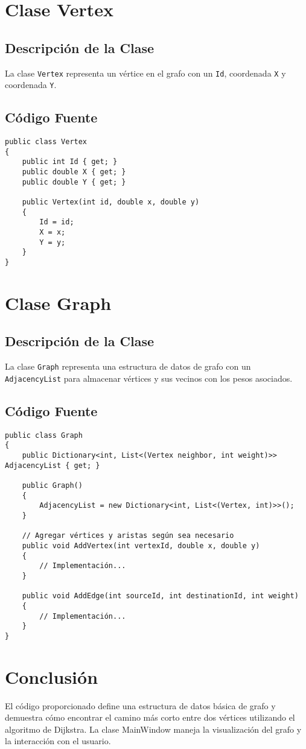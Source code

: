 \documentclass{article}
\begin{document}
\section{Clase Vertex}
\subsection{Descripción de la Clase}
La clase \texttt{Vertex} representa un vértice en el grafo con un \texttt{Id}, coordenada \texttt{X} y coordenada \texttt{Y}.

\subsection{Código Fuente}
\begin{lstlisting}[language={[Sharp]C}]
public class Vertex
{
    public int Id { get; }
    public double X { get; }
    public double Y { get; }

    public Vertex(int id, double x, double y)
    {
        Id = id;
        X = x;
        Y = y;
    }
}
\end{lstlisting}

\section{Clase Graph}
\subsection{Descripción de la Clase}
La clase \texttt{Graph} representa una estructura de datos de grafo con un \texttt{AdjacencyList} para almacenar vértices y sus vecinos con los pesos asociados.

\subsection{Código Fuente}
\begin{lstlisting}[language={[Sharp]C}]
public class Graph
{
    public Dictionary<int, List<(Vertex neighbor, int weight)>> AdjacencyList { get; }

    public Graph()
    {
        AdjacencyList = new Dictionary<int, List<(Vertex, int)>>();
    }

    // Agregar vértices y aristas según sea necesario
    public void AddVertex(int vertexId, double x, double y)
    {
        // Implementación...
    }

    public void AddEdge(int sourceId, int destinationId, int weight)
    {
        // Implementación...
    }
}
\end{lstlisting}

\section{Conclusión}
El código proporcionado define una estructura de datos básica de grafo y demuestra cómo encontrar el camino más corto entre dos vértices utilizando el algoritmo de Dijkstra. La clase MainWindow maneja la visualización del grafo y la interacción con el usuario.
\end{document}
